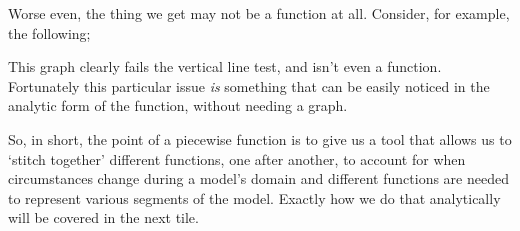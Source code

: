 \documentclass{ximeraXloud}
\begin{document}
Worse even, the thing we get may not be a function at all. Consider, for example, the following;

\begin{center}
\end{center}

This graph clearly fails the vertical line test, and isn't even a function. Fortunately this particular issue \textit{is} something that can be easily noticed in the analytic form of the function, without needing a graph.

So, in short, the point of a piecewise function is to give us a tool that allows us to `stitch together' different functions, one after another, to account for when circumstances change during a model's domain and different functions are needed to represent various segments of the model. Exactly how we do that analytically will be covered in the next tile.
\end{document}
